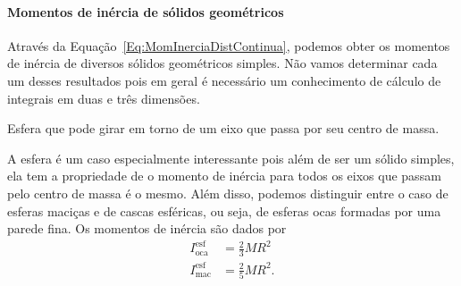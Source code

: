 \paragraph{Momentos de inércia de sólidos geométricos}

Através da Equação~\eqref{Eq:MomInerciaDistContinua}, podemos obter os momentos de inércia de diversos sólidos geométricos simples. Não vamos determinar cada um desses resultados pois em geral é necessário um conhecimento de cálculo de integrais em duas e três dimensões.

\begin{description}

\begin{marginfigure}[2cm]
\centering
{}
\caption{Esfera que pode girar em torno de um eixo que passa por seu centro de massa.}
\end{marginfigure}

    \item[Esfera:] A esfera é um caso especialmente interessante pois além de ser um sólido simples, ela tem a propriedade de o momento de inércia para todos os eixos que passam pelo centro de massa é o mesmo. Além disso, podemos distinguir entre o caso de esferas maciças e de cascas esféricas, ou seja, de esferas ocas formadas por uma parede fina. Os momentos de inércia são dados por
        \begin{align}
            I^{\textrm{esf}}_{\textrm{oca}} &= \frac{2}{3} MR^2 \\
            I^{\textrm{esf}}_{\textrm{mac}} &= \frac{2}{5} MR^2.
        \end{align}
  

\end{description}

